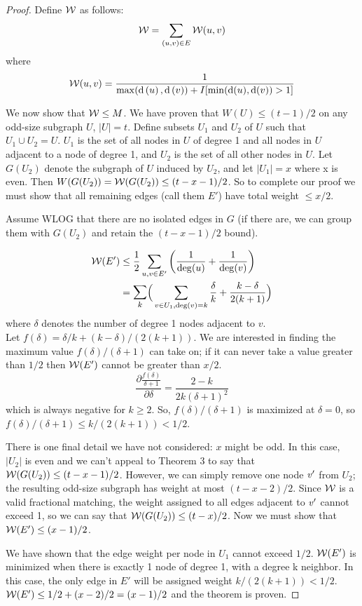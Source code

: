 \begin{proof}
Define $\mathcal {W}$ as follows:
\[\mathcal {W}=\sum_{(u,v)\in E} \mathcal {W}(u,v) \]
where
\[
\mathcal {W}(u,v)=\frac{1}{\max(\textup{d}\left( u\right), \textup{d}\left( v\right) )+I[\min(\textup{d}(u),\textup{d}(v))> 1]}\]

We now show that $\mathcal {W} \leq M$. We have proven that $W(U)\leq (t-1)/2$ on any odd-size subgraph $U$, $|U| = t$.  Define subsets $U_1$ and $U_2$ of $U$ such that $U_1 \cup U_2 = U$.  $U_1$ is the set of all nodes in $U$ of degree 1 and all nodes in $U$ adjacent to a node of degree 1, and $U_2$ is the set of all other nodes in $U$.  Let $G(U_2)$ denote the subgraph of $U$ induced by $U_2$, and let $|U_1| = x$ where x is even.  Then $W(G(U_2)) = \mathcal {W}(G(U_2)) \leq (t-x-1)/2$.  So to complete our proof we must show that all remaining edges (call them $E'$) have total weight $\leq x/2$.

Assume WLOG that there are no isolated edges in $G$ (if there are, we can group them with $G(U_2)$ and retain the $(t-x-1)/2$ bound).

\begin{align*}
\W(E') & \leq \frac{1}{2} \sum_{u,v \in E'} \lp \frac{1}{\deg(u)}+\frac{1}{\deg(v)}\rp\\
& = \mathlarger{\sum_k} \Big(\sum_{v \in U_1, \deg(v) = k} \frac{\delta}{k} + \frac{k-\delta}{2(k+1)}\Big)
\end{align*}
where $\delta$ denotes the number of degree 1 nodes adjacent to $v$.\\
Let $f(\delta) = \delta/k + (k-\delta)/(2(k+1))$.  We are interested in finding the maximum value $f(\delta)/(\delta+1)$ can take on; if it can never take a value greater than $1/2$ then $\mathcal {W}(E')$ cannot be greater than $x/2$.
$$\frac{\partial\frac{f(\delta)}{\delta+1}}{\partial \delta} = \frac{2-k}{2k(\delta+1)^2}$$
which is always negative for $k \geq 2$.  So, $f(\delta)/(\delta+1)$ is maximized at $\delta = 0$, so  $f(\delta)/(\delta+1) \leq k/(2(k+1)) < 1/2.$

There is one final detail we have not considered: $x$ might be odd.  In this case, $|U_2|$ is even and we can't appeal to Theorem 3 to say that $\mathcal {W}(G(U_2)) \leq (t-x-1)/2$.  However, we can simply remove one node $\mathit {v}'$ from $U_2$; the resulting odd-size subgraph has weight at most $(t-x-2)/2$.  Since $\mathcal {W}$ is a valid fractional matching, the weight assigned to all edges adjacent to $\mathit {v}'$ cannot exceed 1, so we can say that $\mathcal {W}(G(U_2)) \leq (t-x)/2$.  Now we must show that $\mathcal {W}(E') \leq (x-1)/2$.

We have shown that the edge weight per node in $U_1$ cannot exceed $1/2$.  $\mathcal {W}(E')$ is minimized when there is exactly 1 node of degree 1, with a degree k neighbor. In this case, the only edge in $E'$ will be assigned weight $k/(2(k+1))< 1/2$.  $\mathcal {W}(E') \leq 1/2 + (x-2)/2 = (x-1)/2$ and the theorem is proven.
\end{proof}


